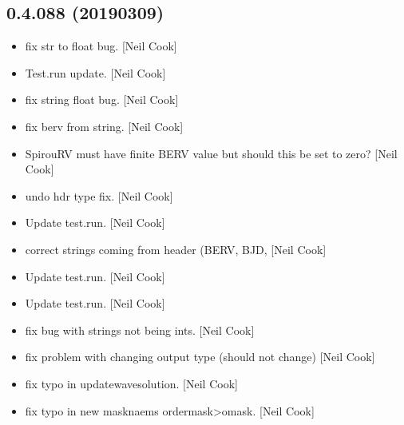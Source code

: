 \documentclass[a4paper,10pt,english]{report}
\begin{document}
\subsection{0.4.088 (2019\sphinxhyphen{}03\sphinxhyphen{}09)}
\label{\detokenize{misc/changelog:id191}}\begin{itemize}
\item {} 
 \sphinxhyphen{} fix str to float bug. {[}Neil Cook{]}

\item {} 
Test.run \sphinxhyphen{} update. {[}Neil Cook{]}

\item {} 
 \sphinxhyphen{} fix string \sphinxhyphen{} float bug. {[}Neil Cook{]}

\item {} 
 \sphinxhyphen{}fix berv from string. {[}Neil Cook{]}

\item {} 
SpirouRV \sphinxhyphen{} must have finite BERV value \textendash{} but should this be set to
zero? {[}Neil Cook{]}

\item {} 
 \sphinxhyphen{} undo hdr type fix. {[}Neil Cook{]}

\item {} 
Update test.run. {[}Neil Cook{]}

\item {} 
 \sphinxhyphen{} correct strings coming from header (BERV, BJD,
 {[}Neil Cook{]}

\item {} 
Update test.run. {[}Neil Cook{]}

\item {} 
Update test.run. {[}Neil Cook{]}

\item {} 
 \sphinxhyphen{} fix bug with strings not being ints. {[}Neil Cook{]}

\item {} 
 \sphinxhyphen{} fix problem with changing output type (should not
change) {[}Neil Cook{]}

\item {} 
 \sphinxhyphen{} fix typo in updatewavesolution. {[}Neil Cook{]}

\item {} 
 \sphinxhyphen{} fix typo in new masknaems ordermask\textendash{}\textgreater{}omask. {[}Neil
Cook{]}


\end{itemize}
\end{document}

